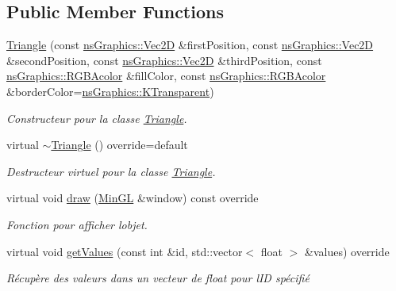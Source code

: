 \subsection*{Public Member Functions}
\begin{DoxyCompactItemize}
\item 
\hyperlink{classns_shape_1_1_triangle_a72e60fed26e09d01757828ec019134c7}{Triangle} (const \hyperlink{classns_graphics_1_1_vec2_d}{ns\+Graphics\+::\+Vec2D} \&first\+Position, const \hyperlink{classns_graphics_1_1_vec2_d}{ns\+Graphics\+::\+Vec2D} \&second\+Position, const \hyperlink{classns_graphics_1_1_vec2_d}{ns\+Graphics\+::\+Vec2D} \&third\+Position, const \hyperlink{classns_graphics_1_1_r_g_b_acolor}{ns\+Graphics\+::\+R\+G\+B\+Acolor} \&fill\+Color, const \hyperlink{classns_graphics_1_1_r_g_b_acolor}{ns\+Graphics\+::\+R\+G\+B\+Acolor} \&border\+Color=\hyperlink{namespacens_graphics_ab2001ad03cceb2565849e04465618c1e}{ns\+Graphics\+::\+K\+Transparent})
\begin{DoxyCompactList}\small\item\em Constructeur pour la classe \hyperlink{classns_shape_1_1_triangle}{Triangle}. \end{DoxyCompactList}\item 
virtual \hyperlink{classns_shape_1_1_triangle_ae59fd091a1005d0e4a7e648487c69739}{$\sim$\+Triangle} () override=default
\begin{DoxyCompactList}\small\item\em Destructeur virtuel pour la classe \hyperlink{classns_shape_1_1_triangle}{Triangle}. \end{DoxyCompactList}\item 
virtual void \hyperlink{classns_shape_1_1_triangle_a4b3867fb0e15995b2a6c261d9b0d968d}{draw} (\hyperlink{class_min_g_l}{Min\+GL} \&window) const override
\begin{DoxyCompactList}\small\item\em Fonction pour afficher l\textquotesingle{}objet. \end{DoxyCompactList}\item 
virtual void \hyperlink{classns_shape_1_1_triangle_a745ce53bf673b56a23a30f732a041834}{get\+Values} (const int \&id, std\+::vector$<$ float $>$ \&values) override
\begin{DoxyCompactList}\small\item\em Récupère des valeurs dans un vecteur de float pour l\textquotesingle{}ID spécifié \end{DoxyCompactList}\item 

\end{DoxyCompactItemize}

